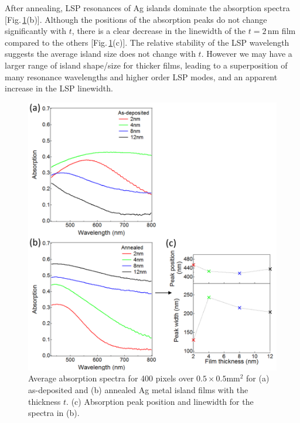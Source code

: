 After annealing, LSP resonances of Ag islands dominate the absorption spectra [Fig.\,\ref{6Fig6}(b)]. Although the positions of the absorption peaks do not change significantly with $t$, there is a clear decrease in the linewidth of the $t=2$\,nm film compared to the others [Fig.\,\ref{6Fig6}(c)]. The relative stability of the LSP wavelength suggests the average island size does not change with $t$. However we may have a larger range of island shape/size for thicker films, leading to a superposition of many resonance wavelengths and higher order LSP modes, and an apparent increase in the LSP linewidth.
\begin{figure}[h!] 
\centering    
\includegraphics[width=\textwidth]{Fig6}
\caption{Average absorption spectra for 400 pixels over $0.5\times0.5$mm$^2$ for (a) as-deposited and (b) annealed Ag metal island films with the thickness $t$. (c) Absorption peak position and linewidth for the spectra in (b).}
\label{6Fig6}
\end{figure}


